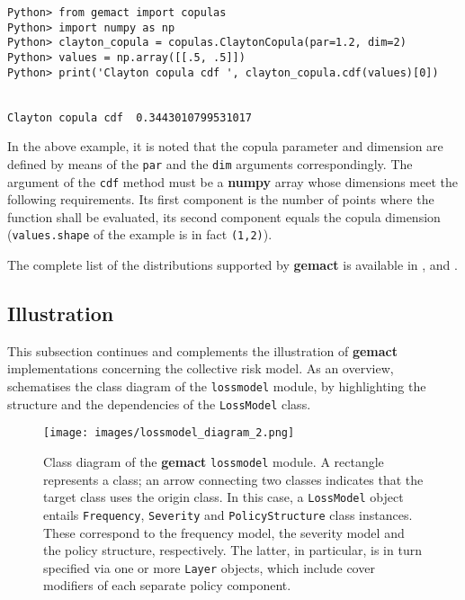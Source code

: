 \documentclass{article}
\begin{document}
\begin{lstlisting}
Python> from gemact import copulas
Python> import numpy as np
Python> clayton_copula = copulas.ClaytonCopula(par=1.2, dim=2)
Python> values = np.array([[.5, .5]])
Python> print('Clayton copula cdf ', clayton_copula.cdf(values)[0])


Clayton copula cdf  0.3443010799531017
\end{lstlisting}

In the above example, it is noted that the copula parameter and dimension are defined by means of the \texttt{par} and the \texttt{dim} arguments correspondingly.
The argument of the \texttt{cdf} method must be a \textbf{numpy} array whose dimensions meet the following requirements. Its first component is the number of points where the function shall be evaluated, its second component equals the copula dimension (\texttt{values.shape} of the example is in fact \texttt{(1,2)}).

The complete list of the distributions supported by \textbf{gemact} is available in ,  and .

\subsection{Illustration}

This subsection continues and complements the illustration of \textbf{gemact} implementations concerning the collective risk model. As an overview,  schematises the class diagram of the \texttt{lossmodel} module, by highlighting the structure and the dependencies of the \texttt{LossModel} class.

\begin{figure}
\centering
    \texttt{[image: images/lossmodel\_diagram\_2.png]}
    \caption{Class diagram of the \textbf{gemact} \texttt{lossmodel} module. A rectangle represents a class; an arrow connecting two classes indicates that the target class uses the origin class. In this case, a \texttt{LossModel} object entails  \texttt{Frequency}, \texttt{Severity} and \texttt{PolicyStructure} class instances. These correspond to the frequency model, the severity model and the policy structure, respectively. The latter, in particular, is in turn specified via one or more \texttt{Layer} objects, which include cover modifiers of each separate policy component.}
    \label{fig:lossmodeldiagram}
\end{figure}
\end{document}
